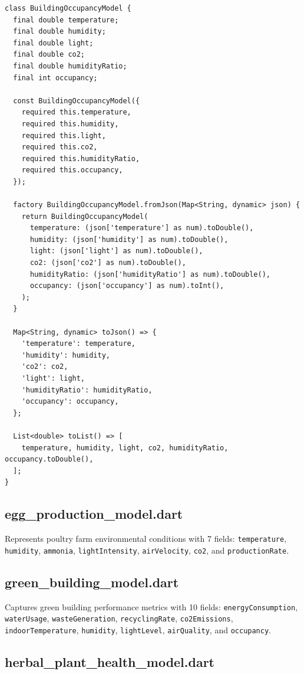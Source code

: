 \documentclass[12pt,a4paper,oneside]{report}
\newcommand{\code}[1]{\texttt{#1}}
\begin{document}
\begin{lstlisting}[style=dartstyle]
class BuildingOccupancyModel {
  final double temperature;
  final double humidity;
  final double light;
  final double co2;
  final double humidityRatio;
  final int occupancy;

  const BuildingOccupancyModel({
    required this.temperature,
    required this.humidity,
    required this.light,
    required this.co2,
    required this.humidityRatio,
    required this.occupancy,
  });

  factory BuildingOccupancyModel.fromJson(Map<String, dynamic> json) {
    return BuildingOccupancyModel(
      temperature: (json['temperature'] as num).toDouble(),
      humidity: (json['humidity'] as num).toDouble(),
      light: (json['light'] as num).toDouble(),
      co2: (json['co2'] as num).toDouble(),
      humidityRatio: (json['humidityRatio'] as num).toDouble(),
      occupancy: (json['occupancy'] as num).toInt(),
    );
  }

  Map<String, dynamic> toJson() => {
    'temperature': temperature,
    'humidity': humidity,
    'co2': co2,
    'light': light,
    'humidityRatio': humidityRatio,
    'occupancy': occupancy,
  };

  List<double> toList() => [
    temperature, humidity, light, co2, humidityRatio, occupancy.toDouble(),
  ];
}
\end{lstlisting}

\subsection{egg\_production\_model.dart}

Represents poultry farm environmental conditions with 7 fields: \code{temperature}, \code{humidity}, \code{ammonia}, \code{lightIntensity}, \code{airVelocity}, \code{co2}, and \code{productionRate}.

\subsection{green\_building\_model.dart}

Captures green building performance metrics with 10 fields: \code{energyConsumption}, \code{waterUsage}, \code{wasteGeneration}, \code{recyclingRate}, \code{co2Emissions}, \code{indoorTemperature}, \code{humidity}, \code{lightLevel}, \code{airQuality}, and \code{occupancy}.

\subsection{herbal\_plant\_health\_model.dart}
\end{document}

